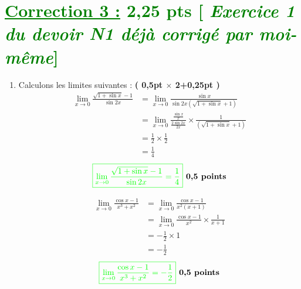 \documentclass[12pt,a4paper]{article}
\begin{document}
\section*{\textcolor{green}{\underline{Correction 3 :} 2,25 pts [\textit{ Exercice 1  du devoir N1 déjà  corrigé par moi-même}]}}
\begin{enumerate}
    \item Calculons les limites suivantes : \hfill \textbf{( 0,5pt $\times$ 2+0,25pt )}
    \begin{align*}
    \lim_{x \to 0} \frac{\sqrt{1+\sin x} - 1}{\sin 2x}&=\lim_{x \to 0} \frac{\sin x }{\sin 2x\left( \sqrt{1+\sin x} + 1\right) }\\
    &=\lim_{x \to 0} \frac{\frac{\sin x}{x} }{\frac{2\sin 2x}{2x}}\times \frac{1}{\left(\sqrt{1+\sin x} + 1\right)}\\
    &=\frac{1}{2}\times\frac{1}{2}\\
    &=\frac{1}{4}
    \end{align*}
\[
\textcolor{green}{\boxed{ \lim_{x \to 0} \frac{\sqrt{1+\sin x} - 1}{\sin 2x}=\frac{1}{4}  }} \textbf{ 0,5 points}
\]

    \begin{align*}
    \lim_{x \to 0} \frac{\cos x - 1}{x^3 + x^2}&=\lim_{x \to 0}\frac{\cos x - 1}{x^2(x + 1)}\\
    &=\lim_{x \to 0} \frac{\cos x - 1}{x^{2}} \times \frac{1}{x+1}\\
    &=-\frac{1}{2}\times1\\
    &=-\frac{1}{2}
    \end{align*}
\[
\textcolor{green}{\boxed{ \lim_{x \to 0} \frac{\cos x - 1}{x^3 + x^2}=-\frac{1}{2}  }} \textbf{ 0,5 points}
\]


\end{enumerate}
\end{document}
